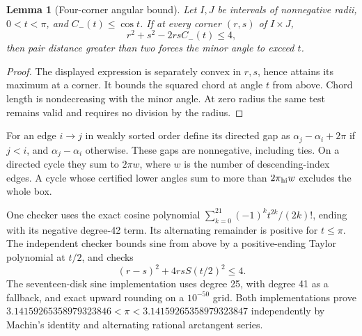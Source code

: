 \documentclass[11pt]{amsart}
\newtheorem{lemma}[theorem]{Lemma}
\theoremstyle{definition}
\theoremstyle{remark}
\begin{document}
\begin{lemma}[Four-corner angular bound]\label{lem:corner}
Let $I,J$ be intervals of nonnegative radii, $0<t<\pi$, and $C_-(t)\le\cos t$.
If at every corner $(r,s)$ of $I\times J$,
\[
 r^2+s^2-2rsC_-(t)\le4,
\]
then pair distance greater than two forces the minor angle to exceed $t$.
\end{lemma}
\begin{proof}
The displayed expression is separately convex in $r,s$, hence attains its
maximum at a corner. It bounds the squared chord at angle $t$ from above.
Chord length is nondecreasing with the minor angle. At zero radius the same
test remains valid and requires no division by the radius.
\end{proof}

For an edge $i\to j$ in weakly sorted order define its directed gap as
$\alpha_j-\alpha_i+2\pi$ if $j<i$, and $\alpha_j-\alpha_i$ otherwise.
These gaps are nonnegative, including ties. On a directed cycle they sum to
$2\pi w$, where $w$ is the number of descending-index edges. A cycle whose
certified lower angles sum to more than $2\pi_{\rm hi}w$ excludes the whole box.

One checker uses the exact cosine polynomial
$\sum_{k=0}^{21}(-1)^k t^{2k}/(2k)!$, ending with its negative degree-42 term.
Its alternating remainder is positive for $t\le\pi$.
The independent checker bounds sine from above by a positive-ending Taylor
polynomial at $t/2$, and checks
\[
(r-s)^2+4rsS(t/2)^2\le4.
\]
The seventeen-disk sine implementation uses degree 25, with degree 41 as
a fallback, and exact upward rounding on a $10^{-50}$ grid.
Both implementations prove
$3.14159265358979323846<\pi<3.14159265358979323847$ independently by
Machin's identity and alternating rational arctangent series.
\end{document}

